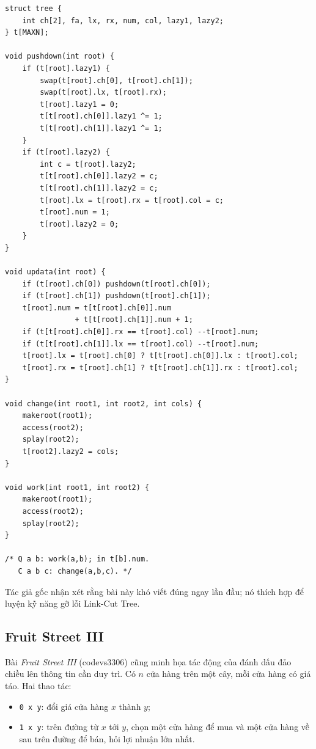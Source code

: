 \documentclass[11pt]{article}
\begin{document}
\begingroup
\small
\begin{verbatim}
struct tree {
    int ch[2], fa, lx, rx, num, col, lazy1, lazy2;
} t[MAXN];

void pushdown(int root) {
    if (t[root].lazy1) {
        swap(t[root].ch[0], t[root].ch[1]);
        swap(t[root].lx, t[root].rx);
        t[root].lazy1 = 0;
        t[t[root].ch[0]].lazy1 ^= 1;
        t[t[root].ch[1]].lazy1 ^= 1;
    }
    if (t[root].lazy2) {
        int c = t[root].lazy2;
        t[t[root].ch[0]].lazy2 = c;
        t[t[root].ch[1]].lazy2 = c;
        t[root].lx = t[root].rx = t[root].col = c;
        t[root].num = 1;
        t[root].lazy2 = 0;
    }
}

void updata(int root) {
    if (t[root].ch[0]) pushdown(t[root].ch[0]);
    if (t[root].ch[1]) pushdown(t[root].ch[1]);
    t[root].num = t[t[root].ch[0]].num
                + t[t[root].ch[1]].num + 1;
    if (t[t[root].ch[0]].rx == t[root].col) --t[root].num;
    if (t[t[root].ch[1]].lx == t[root].col) --t[root].num;
    t[root].lx = t[root].ch[0] ? t[t[root].ch[0]].lx : t[root].col;
    t[root].rx = t[root].ch[1] ? t[t[root].ch[1]].rx : t[root].col;
}

void change(int root1, int root2, int cols) {
    makeroot(root1);
    access(root2);
    splay(root2);
    t[root2].lazy2 = cols;
}

void work(int root1, int root2) {
    makeroot(root1);
    access(root2);
    splay(root2);
}

/* Q a b: work(a,b); in t[b].num.
   C a b c: change(a,b,c). */
\end{verbatim}
\endgroup

Tác giả gốc nhận xét rằng bài này khó viết đúng ngay lần đầu; nó thích hợp để
luyện kỹ năng gỡ lỗi Link-Cut Tree.

\subsection{Fruit Street III}

Bài \textit{Fruit Street III} (codevs3306) cũng minh họa tác động của đánh dấu
đảo chiều lên thông tin cần duy trì.  Có $n$ cửa hàng trên một cây, mỗi cửa
hàng có giá táo.  Hai thao tác:
\begin{itemize}
  \item \texttt{0 x y}: đổi giá cửa hàng $x$ thành $y$;
  \item \texttt{1 x y}: trên đường từ $x$ tới $y$, chọn một cửa hàng để mua và
  một cửa hàng về sau trên đường để bán, hỏi lợi nhuận lớn nhất.
\end{itemize}
\end{document}
